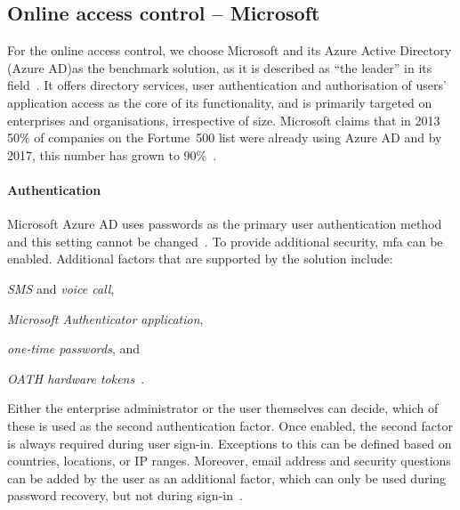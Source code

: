 \subsection{Online access control -- Microsoft}\label{sec:online-access-control}

For the online access control, we choose Microsoft and its Azure Active Directory (Azure AD)\footnotemark as the benchmark solution, as it is described as ``the leader'' in its field~\cite{Kreizman2018MagicWorldwide}. It offers directory services, user authentication and authorisation of users' application access as the core of its functionality, and is primarily targeted on enterprises and organisations, irrespective of size. Microsoft claims that in 2013 50\% of companies on the Fortune~500 list were already using Azure AD and by 2017, this number has grown to 90\%~\cite{Martin201350Azure}.


\paragraph{Authentication} Microsoft Azure AD uses passwords as the primary user authentication method and this setting cannot be changed~\cite{Flores2019AuthenticationMethods}. To provide additional security, \acrlong{mfa} can be enabled. Additional factors that are supported by the solution include:
\begin{enumerate*}[label=(\roman*)]
    \item \textit{SMS} and \textit{voice call},
    \item \textit{Microsoft Authenticator application},
    \item \textit{one-time passwords}, and 
    \item \textit{OATH hardware tokens}\footnotemark~\cite{Flores2019AuthenticationMethods}.
\end{enumerate*}

Either the enterprise administrator or the user themselves can decide, which of these is used as the second authentication factor. Once enabled, the second factor is always required during user sign-in. Exceptions to this can be defined based on countries, locations, or IP ranges. Moreover, email address and security questions can be added by the user as an additional factor, which can only be used during password recovery, but not during sign-in~\cite{eross-msft2018ConfigureAuthentication}.

